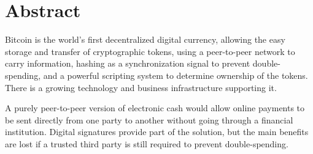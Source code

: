 
%
%
%

%
%

%
%
%
%
%
%
%
%
%
%
%
%
% 
%
%
% 
%
%
%

%
%
%
\chapter*{Abstract}
%
Bitcoin is the world's first decentralized digital currency, allowing the easy 
storage and transfer of cryptographic tokens, using a peer-to-peer network to carry
information, hashing as a synchronization signal to prevent double-spending, 
and a powerful scripting system to determine ownership of the tokens. There is a 
growing technology and business infrastructure supporting it.


A purely peer-to-peer version of electronic cash would allow online
payments to be sent directly from one party to another without going through a
financial institution. Digital signatures provide part of the solution, but the main
benefits are lost if a trusted third party is still required to prevent double-spending.

